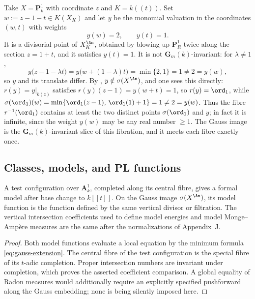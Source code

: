 \begin{example}
\label{ex:ch30-gauss-image-strict}
Take $X=\mathbf P^1_k$ with coordinate $z$ and $K=k(\!(t)\!)$.  Set
$w:=z-1-t\in K(X_K)$ and let $y$ be the monomial valuation in the
coordinates $(w,t)$ with weights
\[
                     y(w)=2,\qquad y(t)=1 .
\]
It is a divisorial point of $X_K^{\An}$, obtained by blowing up
$\mathbf P^1_R$ twice along the section $z=1+t$, and it satisfies
$y(t)=1$.  It is not $\mathbf G_m(k)$-invariant: for
$\lambda\neq1$,
\[
 y\bigl(z-1-\lambda t\bigr)
 =y\bigl(w+(1-\lambda)t\bigr)=\min\{2,1\}=1\neq2=y(w),
\]
so $y$ and its translate differ.  By
, $y\notin\sigma(X^{\An})$, and one sees this
directly: $r(y)=y|_{k(z)}$ satisfies $r(y)(z-1)=y(w+t)=1$, so
$r(y)=\ord_1$, while
$\sigma(\ord_1)(w)=\min\{\ord_1(z-1),\,\ord_1(1)+1\}=1\neq2=y(w)$.  Thus
the fibre $r^{-1}(\ord_1)$ contains at least the two distinct points
$\sigma(\ord_1)$ and $y$; in fact it is infinite, since the weight
$y(w)$ may be any real number $\geq1$.  The Gauss image is the
$\mathbf G_m(k)$-invariant slice of this fibration, and it meets each
fibre exactly once.
\end{example}

\subsection{Classes, models, and PL functions}
\label{sec:ch30-gauss-classes}

\begin{proposition}\label{prop:gauss-model-compatibility}
A test configuration over $\mathbf A^1_k$, completed along its central
fibre, gives a formal model after base change to $k[[t]]$.  On the Gauss
image $\sigma(X^{\An})$, its model function is the function defined by the
same vertical divisor or filtration.  The vertical intersection
coefficients used to define model energies and model Monge--Amp\`ere
measures are the same after the normalizations of Appendix~J.
\end{proposition}

\begin{proof}
Both model functions evaluate a local equation by the minimum formula
\eqref{eq:gauss-extension}.  The central fibre of the test configuration is
the special fibre of its $t$-adic completion.  Proper intersection numbers
are invariant under completion, which proves the asserted coefficient
comparison.  A global equality of Radon measures would additionally require
an explicitly specified pushforward along the Gauss embedding; none is
being silently imposed here.
\end{proof}

